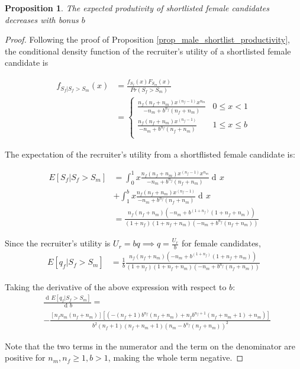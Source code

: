 \documentclass[11pt]{article}
\DeclareMathOperator{\di}{d\!}
\newtheorem{proposition}{Proposition}
\begin{document}
\begin{proposition}\label{prop_female_exp_qual}
    The expected produtivity of shortlisted female candidates decreases with bonus $b$
\end{proposition}
\begin{proof}
    Following the proof of Proposition \ref{prop_male_shortlist_productivity}, the conditional density function of the recruiter's utility of a shortlisted female candidate is

    \begin{align*}
        f_{S_f|S_f>S_m}(x) & = \frac{f_{S_f}(x)F_{S_m}(x) }{Pr(S_f > S_m)} \\
                           & = \begin{cases}
            \frac{n_f(n_f+n_m)x^{(n_f-1)}x^{n_m}}{-n_m+b^{n_f}(n_f+n_m)} & 0 \leq x < 1    \\
            \frac{n_f(n_f+n_m)x^{(n_f-1)}}{-n_m+b^{n_f}(n_f+n_m)}        & 1 \leq x \leq b \\
        \end{cases}
    \end{align*}

    The expectation of the recruiter's utility from a shortflisted female candidate is:

    \begin{align*}
        E[S_f|S_f > S_m] & = \int_0^1{x \frac{ n_f(n_f+n_m)x^{(n_f-1)}x^{n_m}}{-n_m+b^{n_f}(n_f+n_m)} \di x}                 \\
                         & + \int_1^b{x \frac{n_f(n_f+n_m)x^{(n_f-1)}}{-n_m+b^{n_f}(n_f+n_m)} \di x}                         \\
                         & = \frac{n_f(n_f+n_m)(-n_m+b^{(1+n_f)} (1+n_f+n_m))}{(1+n_f) (1+n_f+n_m) (-n_m+b^{n_f} (n_f+n_m))}
    \end{align*}

    Since the recruiter's utility is $U_r = bq \implies q = \frac{U_r}{b}$ for female candidates,
    \begin{align*}
        E[q_f|S_f > S_m] & = \frac{1}{b} \frac{n_f(n_f+n_m)(-n_m+b^{(1+n_f)} (1+n_f+n_m))} {(1+n_f) (1+n_f+n_m) (-n_m+b^{n_f} (n_f+n_m))}
    \end{align*}

    Taking the derivative of the above expression with respect to $b$:
    \begin{align*}
         & \frac{\di E[q_f|S_f > S_m]} {\di b}  =                                                                                                                             \\
         & - \frac{[n_f n_m (n_f+n_m)] [\left(-(n_f+1) b^{n_f} (n_f+n_m)+n_f b^{n_f+1} (n_f+n_m+1)+n_m\right)]}{b^2 (n_f+1) (n_f+n_m+1) \left(n_m-b^{n_f} (n_f+n_m)\right)^2}
    \end{align*}

    Note that the two terms in the numerator and the term on the denominator are positive for $n_m, n_f \geq 1, b>1$, making the whole term negative.

\end{proof}
\end{document}
